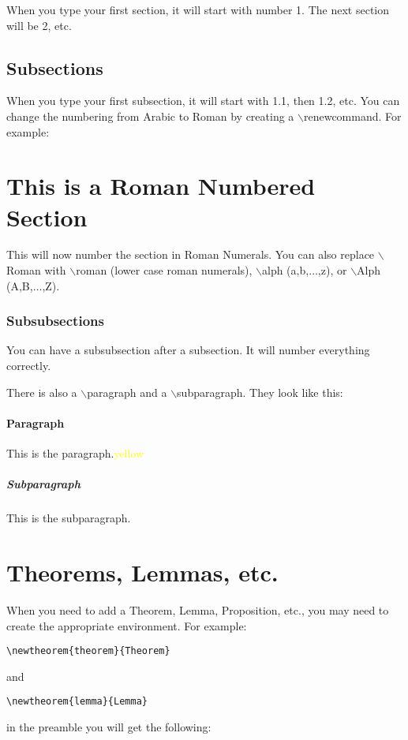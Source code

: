 \documentclass[12pt]{article}   %
\theoremstyle{plain}
\begin{document}
When you type your first section, it will start with number 1.  The next section will be 2, etc.  

\subsection{Subsections}\label{sec:subsections}

When you type your first subsection, it will start with 1.1, then 1.2, etc.  You can change the numbering from Arabic to Roman by creating a $\backslash$renewcommand.  For example:

\renewcommand{\thesection}{\Roman{section}}
\section{This is a Roman Numbered Section}\label{sec:roman}

This will now number the section in Roman Numerals.  You can also replace $\backslash$Roman with $\backslash$roman (lower case roman numerals), $\backslash$alph (a,b,$\dots$,z), or $\backslash$Alph (A,B,$\dots$,Z).

\subsubsection{Subsubsections}\label{subsub}

You can have a subsubsection after a subsection.  It will number everything correctly.

There is also a $\backslash$paragraph and a $\backslash$subparagraph.  They look like this:
\paragraph{Paragraph}\label{para}
This is the paragraph.\textcolor{yellow}{yellow}
\subparagraph{Subparagraph}\label{subpara}
This is the subparagraph.

\renewcommand{\thesection}{\arabic{section}}



\section{Theorems, Lemmas, etc.}\label{sec:theorems}

When you need to add a \label{pg:theorems} Theorem, Lemma, Proposition, etc., you may need to create the appropriate environment.  For example:
\begin{verbatim}\newtheorem{theorem}{Theorem}\end{verbatim} and  \begin{verbatim}\newtheorem{lemma}{Lemma}\end{verbatim} in the preamble you will get the following:
\end{document}
